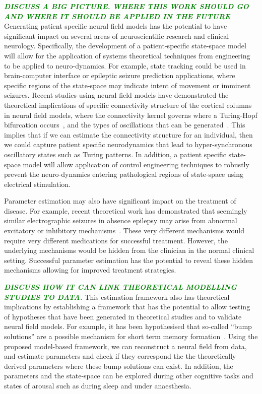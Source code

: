 \documentclass[twocolumn,11pt,a4paper]{article}		%
\newcommand{\dean}[1]{\textsf{\emph{\textbf{\textcolor{green}{#1}}}}}
\begin{document}
\dean{DISCUSS A BIG PICTURE. WHERE THIS WORK SHOULD GO AND WHERE IT SHOULD BE APPLIED IN THE FUTURE}
Generating patient specific neural field models has the potential to have significant impact on several areas of neuroscientific research and clinical neurology. Specifically, the development of a patient-specific state-space model will allow for the application of systems theoretical techniques from engineering to be applied to neuro-dynamics. For example, state tracking could be used in brain-computer interface or epileptic seizure prediction applications, where specific regions of the state-space may indicate intent of movement or imminent seizures. Recent studies using neural field models have demonstrated the theoretical implications of specific connectivity structure of the cortical columns in neural field models, where the connectivity kernel governs where a Turing-Hopf bifurcation occurs~\cite{Hutt2005}, and the types of oscillations that can be generated~\cite{Schmidt2009}. This implies that if we can estimate the connectivity structure for an individual, then we could capture patient specific neurodynamics that lead to hyper-synchronous oscillatory states such as Turing patterns. In addition, a patient specific state-space model will allow application of control engineering techniques to robustly prevent the neuro-dynamics entering pathological regions of state-space using electrical stimulation. 

Parameter estimation may also have significant impact on the treatment of disease. For example, recent theoretical work has demonstrated that seemingly similar electrographic seizures in absence epilepsy may arise from abnormal excitatory or inhibitory mechanisms~\cite{Marten2009}. These very different mechanisms would require very different medications for successful treatment. However, the underlying mechanisms would be hidden from the clinician in the normal clinical setting. Successful parameter estimation has the potential to reveal these hidden mechanisms allowing for improved treatment strategies.

\dean{DISCUSS HOW IT CAN LINK THEORETICAL MODELLING STUDIES TO DATA.}
This estimation framework also has theoretical implications by establishing a framework that has the potential to allow testing of hypotheses that have been generated in theoretical studies and to validate neural field models. For example, it has been hypothesised that so-called ``bump solutions'' are a possible mechanism for short term memory formation~\cite{Coombes2005}. Using the proposed model-based framework, we can reconstruct a neural field from data, and estimate parameters and check if they correspond the the theoretically derived parameters where these bump solutions can exist. In addition, the parameters and the state-space can be explored during other cognitive tasks and states of arousal such as during sleep and under anaesthesia. 
\end{document}
